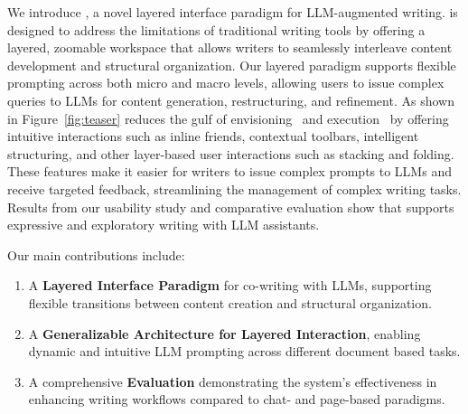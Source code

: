 We introduce \system, a novel layered interface paradigm for LLM-augmented writing. \system is designed to address the limitations of traditional writing tools by offering a layered, zoomable workspace that allows writers to seamlessly interleave content development and structural organization. Our layered paradigm supports flexible prompting across both micro and macro levels, allowing users to issue complex queries to LLMs for content generation, restructuring, and refinement. As shown in Figure~\ref{fig:teaser} \system reduces the gulf of envisioning~\cite{subramonyam2024bridging} and execution~\cite{hutchins1985direct} by offering intuitive interactions such as inline friends, contextual toolbars, intelligent structuring, and other layer-based user interactions such as stacking and folding. These features make it easier for writers to issue complex prompts to LLMs and receive targeted feedback, streamlining the management of complex writing tasks. Results from our usability study and comparative evaluation show that \system supports expressive and exploratory writing with LLM assistants. 

Our main contributions include:
\begin{enumerate}
    \item A \textbf{Layered Interface Paradigm} for co-writing with LLMs, supporting flexible transitions between content creation and structural organization.
    \item A \textbf{Generalizable Architecture for Layered Interaction}, enabling dynamic and intuitive LLM prompting across different document based tasks.
    \item A comprehensive \textbf{Evaluation} demonstrating the system's effectiveness in enhancing writing workflows compared to chat- and page-based paradigms.
\end{enumerate}





